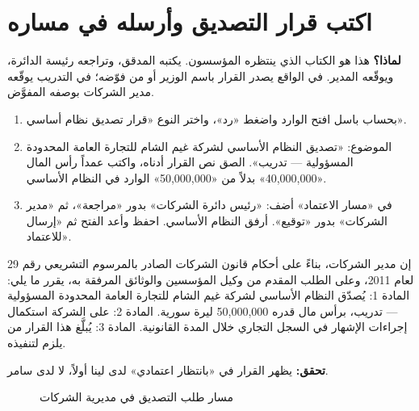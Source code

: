 \section{اكتب قرار التصديق وأرسله في مساره}
\label{sec:co-decision}
\textbf{لماذا؟} هذا هو الكتاب الذي ينتظره المؤسسون. يكتبه المدقق، وتراجعه رئيسة الدائرة، ويوقّعه المدير. في الواقع يصدر القرار باسم الوزير أو من فوّضه؛ في التدريب يوقّعه مدير الشركات بوصفه المفوَّض.
\begin{enumerate}
\item بحساب باسل افتح الوارد  واضغط «رد»، واختر النوع «قرار تصديق نظام أساسي».
\item الموضوع: «تصديق النظام الأساسي لشركة غيم الشام للتجارة العامة المحدودة المسؤولية — تدريب». الصق نص القرار أدناه، واكتب عمداً رأس المال «40,000,000» بدلاً من «50,000,000» الوارد في النظام الأساسي.
\item في «مسار الاعتماد» أضف: «رئيس دائرة الشركات» بدور «مراجعة»، ثم «مدير الشركات» بدور «توقيع». أرفق النظام الأساسي. احفظ وأعد الفتح ثم «إرسال للاعتماد».
\end{enumerate}
\begin{rcnote}[نص القرار]
إن مدير الشركات، بناءً على أحكام قانون الشركات الصادر بالمرسوم التشريعي رقم 29 لعام 2011، وعلى الطلب المقدم من وكيل المؤسسين والوثائق المرفقة به، يقرر ما يلي: المادة 1: يُصدّق النظام الأساسي لشركة غيم الشام للتجارة العامة المحدودة المسؤولية — تدريب، برأس مال قدره 50,000,000 ليرة سورية. المادة 2: على الشركة استكمال إجراءات الإشهار في السجل التجاري خلال المدة القانونية. المادة 3: يُبلَّغ هذا القرار من يلزم لتنفيذه.
\end{rcnote}
\textbf{تحقق:} يظهر القرار في «بانتظار اعتمادي» لدى لينا أولاً، لا لدى سامر.

\begin{figure}[H]
\centering
{}
\rclegend
\caption{مسار طلب التصديق في مديرية الشركات}
\label{fig:co-route}
\end{figure}

